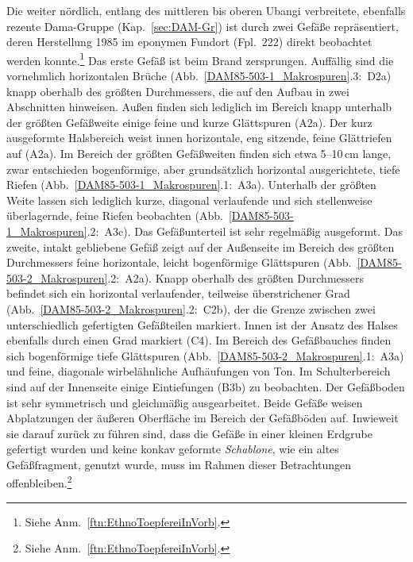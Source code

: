 \begin{multicols}{2}
Die weiter nördlich, entlang des mittleren bis oberen \mbox{Ubangi} verbreitete, ebenfalls rezente Dama-Gruppe (Kap.~\ref{sec:DAM-Gr}) ist durch zwei Gefäße repräsentiert, deren Herstellung 1985 im eponymen Fundort (Fpl.~222) direkt beobachtet werden konnte.\footnote{Siehe Anm.~\ref{ftn:EthnoToepfereiInVorb}.} Das erste Gefäß ist beim Brand zersprungen. Auffällig sind die vornehmlich horizontalen Brüche (Abb.~\ref{DAM85-503-1_Makrospuren}.3:~D2a) knapp oberhalb des größten Durchmessers, die auf den Aufbau in zwei Abschnitten hinweisen. Außen finden sich lediglich im Bereich knapp unterhalb der größten Gefäßweite einige feine und kurze Glättspuren (A2a). Der kurz ausgeformte Halsbereich weist innen horizontale, eng sitzende, feine Glättriefen auf (A2a). Im Bereich der größten Gefäßweiten finden sich etwa 5--10\,cm lange, zwar entschieden bogenförmige, aber grundsätzlich horizontal ausgerichtete, tiefe Riefen (Abb.~\ref{DAM85-503-1_Makrospuren}.1:~A3a). Unterhalb der größten Weite lassen sich lediglich kurze, diagonal verlaufende und sich stellenweise überlagernde, feine Riefen beobachten (Abb.~\ref{DAM85-503-1_Makrospuren}.2:~A3c). Das Gefäßunterteil ist sehr regelmäßig ausgeformt.	Das zweite, intakt gebliebene Gefäß zeigt auf der Außenseite im Bereich des größten Durchmessers feine horizontale, leicht bogenförmige Glättspuren (Abb.~\ref{DAM85-503-2_Makrospuren}.2:~A2a). Knapp oberhalb des größten Durchmessers befindet sich ein horizontal verlaufender, teilweise überstrichener Grad (Abb.~\ref{DAM85-503-2_Makrospuren}.2:~C2b), der die Grenze zwischen zwei unterschiedlich gefertigten Gefäßteilen markiert. Innen ist der Ansatz des Halses ebenfalls durch einen Grad markiert (C4). Im Bereich des Gefäßbauches finden sich bogenförmige tiefe Glättspuren (Abb.~\ref{DAM85-503-2_Makrospuren}.1:~A3a) und feine, diagonale wirbelähnliche Aufhäufungen von Ton. Im Schulterbereich sind auf der Innenseite einige Eintiefungen (B3b) zu beobachten. Der Gefäßboden ist sehr symmetrisch und gleichmäßig ausgearbeitet. Beide Gefäße weisen Abplatzungen der äußeren Oberfläche im Bereich der Gefäßböden auf. Inwieweit sie darauf zurück zu führen sind, dass die Gefäße in einer kleinen Erdgrube gefertigt wurden und keine konkav geformte \textit{Schablone}, wie ein altes Gefäßfragment, genutzt wurde, muss im Rahmen dieser Betrachtungen offenbleiben.\footnote{Siehe Anm.~\ref{ftn:EthnoToepfereiInVorb}.}


\end{multicols}
